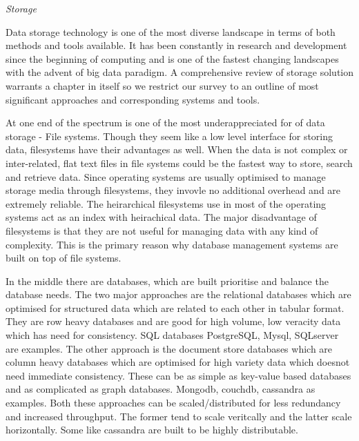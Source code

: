
\vspace{1.5em}\noindent\textit{Storage}\vspace{0.5em}

Data storage technology is one of the most diverse landscape in terms of both methods and tools available.
It has been constantly in research and development since the beginning of computing and is one of the fastest changing landscapes with the advent of big data paradigm.
A comprehensive review of storage solution warrants a chapter in itself so we restrict our survey to an outline of most significant approaches and corresponding systems and tools.

At one end of the spectrum is one of the most underappreciated for of data storage - File systems.
Though they seem like a low level interface for storing data, filesystems have their advantages as well.
When the data is not complex or inter-related, flat text files in file systems could be the fastest way to store, search and retrieve data.
Since operating systems are usually optimised to manage storage media through filesystems, they invovle no additional overhead and are extremely reliable.
The heirarchical filesystems use in most of the operating systems act as an index with heirachical data.
The major disadvantage of filesystems is that they are not useful for managing data with any kind of complexity.
This is the primary reason why database management systems are built on top of file systems.

In the middle there are databases, which are built prioritise and balance the database needs.
The two major approaches are the relational databases which are optimised for structured data which are related to each other in tabular format.
They are row heavy databases and are good for high volume, low veracity data which has need for consistency.
SQL databases PostgreSQL, Mysql, SQLserver are examples.
The other approach is the document store databases which are column heavy databases which are optimised for high variety data which doesnot need immediate consistency.
These can be as simple as key-value based databases and as complicated as graph databases.
Mongodb, couchdb, cassandra as examples.
Both these approaches can be scaled/distributed for less redundancy and increased throughput.
The former tend to scale veritcally and the latter scale horizontally.
Some like cassandra are built to be highly distributable.

